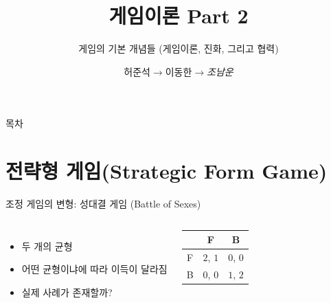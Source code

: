 \documentclass[final]{beamer}
\title{게임이론 Part 2}
\subtitle{게임의 기본 개념들 (게임이론, 진화, 그리고 협력)}
\author[조남운]{허준석$\rightarrow$이동한$\rightarrow$\emph{조남운}\\\mail}
\begin{document}
\begin{frame}[t]{}
	\titlepage
\end{frame}

\begin{frame}[t]{목차}
	\tableofcontents
\end{frame}

\section{전략형 게임(Strategic Form Game)} %
\label{sec:StrategicForm}

\begin{frame}[t]{조정 게임의 변형: 성대결 게임 (Battle of Sexes)}
	\begin{columns}
		\begin{itemize}
			\item 두 개의 균형
			\item 어떤 균형이냐에 따라 이득이 달라짐
			\item 실제 사례가 존재할까?
		\end{itemize}
		\begin{center}
			\begin{table}
				\setlength{\tabcolsep}{1.2em}
				\begin{tabular}{|c|c|c|} \hline
				& {F} &  {B} \\ \hline
				{F} & {$2$}, {$1$} & {$0$}, {$0$} \\ \hline%
				{B} & {$0$}, {$0$}  & {$1$}, {$2$} \\ 
				\hline
				\end{tabular}
			\end{table}
		\end{center}
	\end{columns}
\end{frame}
\end{document}
